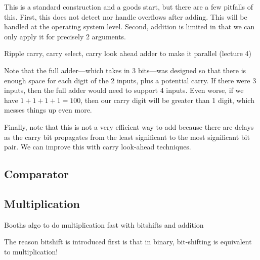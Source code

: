   \begin{corollary}
    
  \end{corollary}

  This is a standard construction and a goods start, but there are a few pitfalls of this. First, this does not detect nor handle overflows after adding. This will be handled at the operating system level. Second, addition is limited in that we can only apply it for precisely 2 arguments. 

  Ripple carry, carry select, carry look ahead adder to make it parallel (lecture 4)

  \begin{example}
    Note that the full adder---which takes in 3 bits---was designed so that there is enough space for each digit of the 2 inputs, plus a potential carry. If there were 3 inputs, then the full adder would need to support 4 inputs. Even worse, if we have $1 + 1 + 1 + 1 = 100$, then our carry digit will be greater than 1 digit, which messes things up even more. 
  \end{example}

  Finally, note that this is not a very efficient way to add because there are delays as the carry bit propagates from the least significant to the most significant bit pair. We can improve this with carry look-ahead techniques. 

\subsection{Comparator}

\subsection{Multiplication} 

  Booths algo to do multiplication fast with bitshifts and addition 

  \begin{theorem}
    
  \end{theorem}

  The reason bitshift is introduced first is that in binary, bit-shifting is equivalent to multiplication! 

  \begin{theorem}
    
  \end{theorem}

